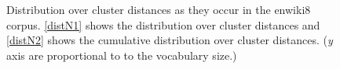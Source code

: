\documentclass[11pt]{article}
\begin{document}
\begin{figure}
	\center
	\newline
	\caption{Distribution over cluster distances as they occur in the enwiki8 corpus. \ref{distN1} shows the distribution over cluster distances and \ref{distN2} shows the cumulative distribution over cluster distances. (\textit{y} axis are proportional to to the vocabulary size.)}
	\label{distN}
\end{figure}
\end{document}
